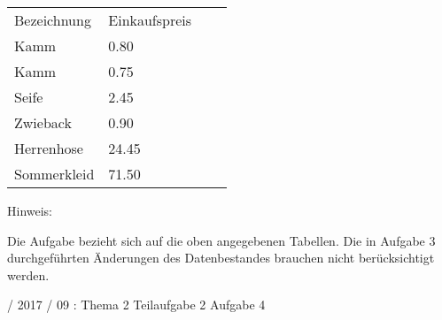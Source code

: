 \documentclass{lehramt-informatik-haupt}
\begin{document}
\begin{enumerate}
\begin{enumerate}
\begin{antwort}[muster]
\begin{tabular}{llll}
Bezeichnung  & Einkaufspreis \\
Kamm         & 0.80          \\
Kamm         & 0.75          \\
Seife        & 2.45          \\
Zwieback     & 0.90          \\
Herrenhose   & 24.45         \\
Sommerkleid  & 71.50
\end{tabular}
\end{antwort}

Hinweis:

Die Aufgabe bezieht sich auf die oben angegebenen Tabellen. Die in
Aufgabe 3 durchgeführten Änderungen des Datenbestandes brauchen nicht
berücksichtigt werden.

\end{enumerate}
\end{enumerate}

 / 2017 / 09 : Thema 2 Teilaufgabe 2 Aufgabe 4
\end{document}
